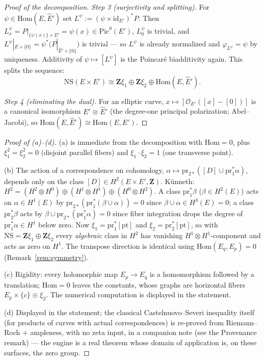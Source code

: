 \documentclass[11pt]{article}
\theoremstyle{definition}
\theoremstyle{remark}
\newcommand{\Z}{\mathbf{Z}}
\newcommand{\NS}{\mathrm{NS}}
\newcommand{\Hom}{\mathrm{Hom}}
\newcommand{\Pic}{\mathrm{Pic}}
\newcommand{\pr}{\mathrm{pr}}
\begin{document}
\begin{proof}[Proof of the decomposition]
\emph{Step 3 (surjectivity and splitting).} For $\psi \in \Hom(E, \hat{E}')$
set $L^\psi := (\psi \times \mathrm{id}_{E'})^* P$. Then
$L^\psi_x = P|_{\{\psi(x)\}\times E'} = \psi(x) \in \Pic^0(E')$, $L^\psi_0$
is trivial, and $L^\psi|_{E\times\{0\}} = \psi^*\bigl(P|_{\hat{E}'\times\{0\}}\bigr)$
is trivial --- so $L^\psi$ is already normalized and
$\varphi_{L^\psi} = \psi$ by uniqueness. Additivity of
$\psi \mapsto [L^\psi]$ is the Poincar\'e biadditivity again. This splits
the sequence:
\[
\NS(E\times E') \cong \Z\xi_1 \oplus \Z\xi_2 \oplus \Hom(E, \hat{E}') .
\]

\emph{Step 4 (eliminating the dual).} For an elliptic curve,
$x \mapsto [\mathcal{O}_{E'}([x] - [0])]$ is a canonical isomorphism
$E' \cong \hat{E}'$ (the degree-one principal polarization; Abel--Jacobi),
so $\Hom(E, \hat{E}') \cong \Hom(E, E')$.
\end{proof}

\begin{proof}[Proof of \textup{(a)}--\textup{(d)}]
(a) is immediate from the decomposition with $\Hom = 0$, plus
$\xi_1^2 = \xi_2^2 = 0$ (disjoint parallel fibers) and
$\xi_1\cdot\xi_2 = 1$ (one transverse point).

(b) The action of a correspondence on cohomology,
$\alpha \mapsto \pr_{2*}([D] \cup \pr_1^*\alpha)$, depends only on the class
$[D] \in H^2(E\times E', \Z)$. K\"unneth:
$H^2 = (H^2\otimes H^0) \oplus (H^1\otimes H^1) \oplus (H^0\otimes H^2)$. A
class $\pr_1^*\beta$ ($\beta \in H^2(E)$) acts on $\alpha \in H^1(E)$ by
$\pr_{2*}(\pr_1^*(\beta \cup \alpha)) = 0$ since
$\beta \cup \alpha \in H^3(E) = 0$; a class $\pr_2^*\beta$ acts by
$\beta \cup \pr_{2*}(\pr_1^*\alpha) = 0$ since fiber integration drops the
degree of $\pr_1^*\alpha \in H^1$ below zero. Now $\xi_1 = \pr_1^*[\mathrm{pt}]$
and $\xi_2 = \pr_2^*[\mathrm{pt}]$, so with $\NS = \Z\xi_1 \oplus \Z\xi_2$
every \emph{algebraic} class in $H^2$ has vanishing
$H^1\otimes H^1$-component and acts as zero on $H^1$. The transpose
direction is identical using $\Hom(E_q, E_p) = 0$
(Remark~\ref{rem:symmetry}).

(c) Rigidity: every holomorphic map $E_p \to E_q$ is a homomorphism followed
by a translation; $\Hom = 0$ leaves the constants, whose graphs are
horizontal fibers $E_p \times \{c\} \equiv \xi_2$. The numerical computation
is displayed in the statement.

(d) Displayed in the statement; the classical Castelnuovo--Severi inequality
itself (for products of curves with actual correspondences) is re-proved
from Riemann--Roch $+$ ampleness, with no zeta input, in a companion note
(see the Provenance remark) --- the engine is a real theorem whose domain of
application is, on these surfaces, the zero group.
\end{proof}
\end{document}
